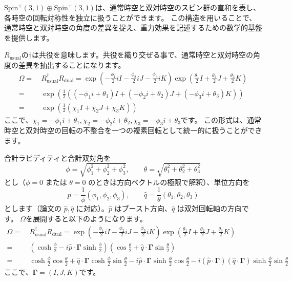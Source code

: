 \documentclass[a4paper,12pt,notitlepage]{jsreport}
\begin{document}
$ \mathrm{Spin}^+(3,1) \oplus \mathrm{Spin}^+(3,1) $は、通常時空と双対時空のスピン群の直和を表し、各時空の回転対称性を独立に扱うことができます。
この構造を用いることで、通常時空と双対時空の角度の差異を捉え、重力効果を記述するための数学的基盤を提供します。

$ R_\text{usual} $の$ \dagger $は共役を意味します。共役を織り交ぜる事で、通常時空と双対時空の角度の差異を抽出することになります。
\begin{equation}
  \begin{split}
    \Omega =~& R_\text{usual}^\dagger R_\text{dual} = \exp\left( -\frac{\phi_1}{2} iI - \frac{\phi_2}{2} iJ - \frac{\phi_3}{2} iK \right) \exp\left( \frac{\theta_1}{2} I + \frac{\theta_2}{2} J + \frac{\theta_3}{2} K \right)\\
    =~& \exp\left( \frac{1}{2}\left( (-\phi_1 i + \theta_1) I + (-\phi_2 i + \theta_2) J + (-\phi_3 i + \theta_3) K \right) \right)
    \\
    =~& \exp\left( \frac{1}{2}\left( \chi_1 I + \chi_2 J + \chi_3 K \right) \right)
  \end{split}
\end{equation}
ここで、$ \chi_1 = -\phi_1 i + \theta_1, \chi_2 = -\phi_2 i + \theta_2, \chi_3 = -\phi_3 i + \theta_3 $です。
この形式は、通常時空と双対時空の回転の不整合を一つの複素回転として統一的に扱うことができます。

合計ラピディティと合計双対角を
\begin{equation}
  \phi = \sqrt{\phi_1^2 + \phi_2^2 + \phi_3^2}, \qquad
  \theta = \sqrt{\theta_1^2 + \theta_2^2 + \theta_3^2}
\end{equation}
とし（$\phi = 0$ または $\theta = 0$ のときは方向ベクトルの極限で解釈）、単位方向を
\begin{equation}
  \hat{p} = \frac{1}{\phi}(\phi_1, \phi_2, \phi_3), \qquad
  \hat{q} = \frac{1}{\theta}(\theta_1, \theta_2, \theta_3)
\end{equation}
とします（論文の $\hat{p},\hat{q}$ に対応）。$\hat{p}$ はブースト方向、$\hat{q}$ は双対回転軸の方向です。
$ \Omega $を展開すると以下のようになります。
\begin{equation}
  \begin{split}
    \Omega =~& R_\text{usual}^\dagger R_\text{dual} = \exp\left( -\frac{\phi_1}{2} iI - \frac{\phi_2}{2} iJ - \frac{\phi_3}{2} iK \right) \exp\left( \frac{\theta_1}{2} I + \frac{\theta_2}{2} J + \frac{\theta_3}{2} K \right)\\
    =~& \left( \cosh \frac{\phi}{2} - i \hat{p} \cdot \bm{\Gamma} \sinh \frac{\phi}{2} \right) \left( \cos \frac{\theta}{2} + \hat{q} \cdot \bm{\Gamma} \sin \frac{\theta}{2} \right)
    \\
    =~& \cosh \frac{\phi}{2} \cos \frac{\theta}{2} + \hat{q} \cdot \bm{\Gamma} \cosh \frac{\phi}{2} \sin \frac{\theta}{2} - i \hat{p} \cdot \bm{\Gamma} \sinh \frac{\phi}{2} \cos \frac{\theta}{2} - i (\hat{p} \cdot \bm{\Gamma})(\hat{q} \cdot \bm{\Gamma}) \sinh \frac{\phi}{2} \sin \frac{\theta}{2}
  \end{split}
\end{equation}
ここで、$ \bm{\Gamma} = (I, J, K) $です。
\end{document}
